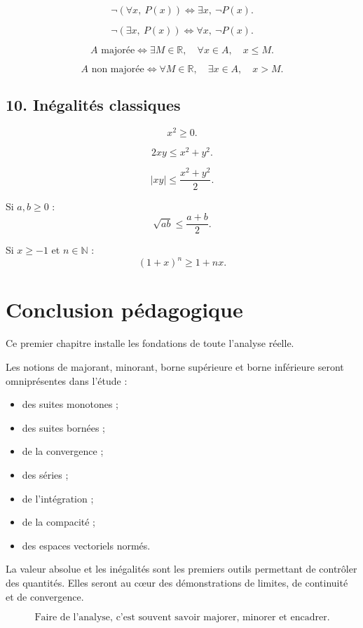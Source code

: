 \documentclass[11pt,a4paper]{article}
\newcommand{\N}{\mathbb N}
\newcommand{\R}{\mathbb R}
\newcommand{\abs}[1]{\left|#1\right|}
\newcommand{\ssi}{\Longleftrightarrow}
\begin{document}
\[
\neg(\forall x,\ P(x))
\ssi
\exists x,\ \neg P(x).
\]

\[
\neg(\exists x,\ P(x))
\ssi
\forall x,\ \neg P(x).
\]

\[
A\text{ majorée}
\ssi
\exists M\in\R,\quad \forall x\in A,\quad x\leq M.
\]

\[
A\text{ non majorée}
\ssi
\forall M\in\R,\quad \exists x\in A,\quad x>M.
\]

\subsection*{10. Inégalités classiques}

\[
x^2\geq0.
\]

\[
2xy\leq x^2+y^2.
\]

\[
\abs{xy}\leq\frac{x^2+y^2}{2}.
\]

Si \(a,b\geq0\) :
\[
\sqrt{ab}\leq\frac{a+b}{2}.
\]

Si \(x\geq -1\) et \(n\in\N\) :
\[
(1+x)^n\geq1+nx.
\]

\section*{Conclusion pédagogique}

Ce premier chapitre installe les fondations de toute l'analyse réelle.

Les notions de majorant, minorant, borne supérieure et borne inférieure seront omniprésentes dans l'étude :
\begin{itemize}
    \item des suites monotones ;
    \item des suites bornées ;
    \item de la convergence ;
    \item des séries ;
    \item de l'intégration ;
    \item de la compacité ;
    \item des espaces vectoriels normés.
\end{itemize}

La valeur absolue et les inégalités sont les premiers outils permettant de contrôler des quantités.  
Elles seront au cœur des démonstrations de limites, de continuité et de convergence.

\begin{center}
\[
\boxed{
\text{Faire de l'analyse, c'est souvent savoir majorer, minorer et encadrer.}
}
\]
\end{center}
\end{document}
